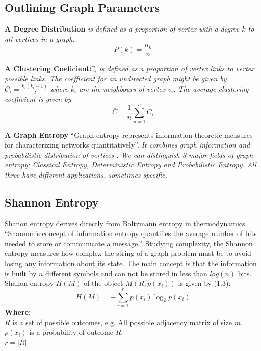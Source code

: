 \subsection{Outlining Graph Parameters}
\begin{definition}\textbf{A Degree Distribution} \emph{is defined as a proportion of vertex with a degree $k$ to all vertices in a graph.}
\begin{equation}
P(k) = \frac{n_k}{n}
\end{equation}
\end{definition}
\begin{definition}\textbf{A Clustering Coeficient}\emph{$C_i$ is defined as a proportion of vertex links to vertex possible links. The coefficient for an undirected graph might be given by $C_i = \frac{k_i(k_i-1)}{2}$ where $k_i$ are the neighbours of vertex $v_i$. The average clustering coefficient is given by}
\begin{equation}
\bar{C} = \frac{1}{n}\sum_{n = 1}^{n} C_i
\end{equation}
\end{definition}
\begin{definition}\textbf{A Graph Entropy} “Graph entropy represents information-theoretic measures for characterizing networks quantitatively”\cite{Dehmer}. \emph{It combines graph information and probabilistic distribution of vertices \cite{Changiz}. We can distinguish 3 major fields of graph entropy: Classical Entropy, Deterministic Entropy and Probabilistic Entropy. All three have different applications, sometimes specific.}\end{definition}
\subsection{Shannon Entropy}
Shanon entropy derives directly from Boltzmann entropy in thermodynamics. “Shannon’s concept of information entropy quantifies the average number of bits needed to store or communicate a message.”\cite{Zenil}. Studying complexity, the Shannon entropy measures how complex the string of a graph problem must be to avoid losing any information about its state. The main concept is that the information is built by $n$ different symbols and can not be stored in less than $log(n)$ bits.
Shanon entropy $H(M)$ of the object $M(R, p(x_i))$ is given by (1.3)\cite{Zenil}:
\begin{equation}
H(M) = - \sum_{r = 1}^{r} p(x_i)\log_2 p(x_i)
\end{equation}
\textbf{Where:}\\
$R$ is a set of possible outcomes, e.g.  All possible adjacency matrix of size $m$\\
$p(x_i)$ is a probability of outcome $R$,\\
$r= |R|$\\
